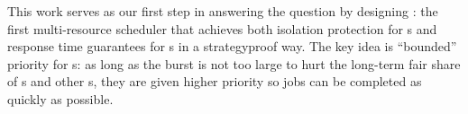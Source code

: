 
This work serves as our first step in answering the question by designing \name: the first multi-resource scheduler that achieves both isolation protection for {\batchq}s and response time guarantees for {\burstq}s in a strategyproof way. 
The key idea is ``bounded'' priority for {\burstq}s: as long as the burst is not too large to hurt the long-term fair share of {\batchq}s and other {\burstq}s, they are given higher priority so jobs can be completed as quickly as possible. %